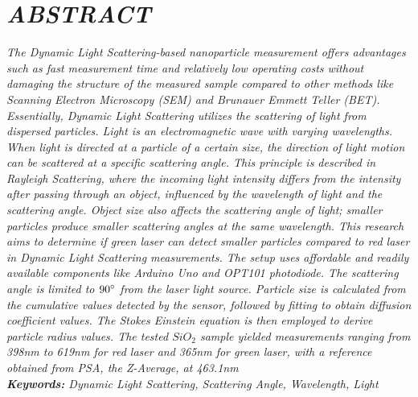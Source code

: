 \chapter*{\centering \textit{ABSTRACT}}

\begin{spacing}{1.25}
\noindent\textit{
    The Dynamic Light Scattering-based nanoparticle measurement offers advantages such
    as fast measurement time and relatively low operating costs without damaging the
    structure of the measured sample compared to other methods like Scanning Electron
    Microscopy (SEM) and Brunauer Emmett Teller (BET). Essentially, Dynamic Light
    Scattering utilizes the scattering of light from dispersed particles. Light is
    an electromagnetic wave with varying wavelengths. When light is directed at a
    particle of a certain size, the direction of light motion can be scattered at
    a specific scattering angle. This principle is described in Rayleigh Scattering,
    where the incoming light intensity differs from the intensity after passing through
    an object, influenced by the wavelength of light and the scattering angle. Object
    size also affects the scattering angle of light; smaller particles produce smaller
    scattering angles at the same wavelength. This research aims to determine if green
    laser can detect smaller particles compared to red laser in Dynamic Light Scattering
    measurements. The setup uses affordable and readily available components like
    Arduino Uno and OPT101 photodiode. The scattering angle is limited to ${90\degree}$
    from the laser light source. Particle size is calculated from the cumulative values
    detected by the sensor, followed by fitting to obtain diffusion coefficient values.
    The Stokes Einstein equation is then employed to derive particle radius values.
    The tested ${SiO_2}$ sample yielded measurements ranging from 398nm to 619nm for
    red laser and 365nm for green laser, with a reference obtained from PSA,
    the Z-Average, at 463.1nm \\
\textbf{Keywords:} Dynamic Light Scattering, Scattering Angle, Wavelength, Light}
\end{spacing}